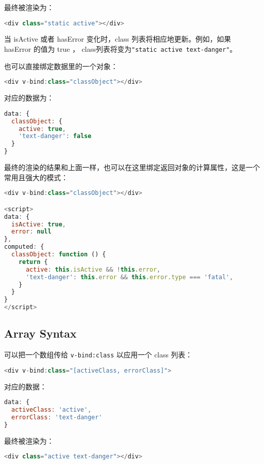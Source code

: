 最终被渲染为：


\begin{lstlisting}[language=JavaScript]
<div class="static active"></div>
\end{lstlisting}

当 isActive 或者 hasError 变化时，class 列表将相应地更新。例如，如果 hasError 的值为 true ， class列表将变为\texttt{"static active text-danger"}。

也可以直接绑定数据里的一个对象：

\begin{lstlisting}[language=JavaScript]
<div v-bind:class="classObject"></div>
\end{lstlisting}

对应的数据为：

\begin{lstlisting}[language=JavaScript]
data: {
  classObject: {
    active: true,
    'text-danger': false
  }
}
\end{lstlisting}

最终的渲染的结果和上面一样，也可以在这里绑定返回对象的计算属性，这是一个常用且强大的模式：

\begin{lstlisting}[language=JavaScript]
<div v-bind:class="classObject"></div>

<script>
data: {
  isActive: true,
  error: null
},
computed: {
  classObject: function () {
    return {
      active: this.isActive && !this.error,
      'text-danger': this.error && this.error.type === 'fatal',
    }
  }
}
</script>
\end{lstlisting}


\subsection{Array Syntax}

可以把一个数组传给 \texttt{v-bind:class} 以应用一个 class 列表：


\begin{lstlisting}[language=JavaScript]
<div v-bind:class="[activeClass, errorClass]">
\end{lstlisting}

对应的数据：

\begin{lstlisting}[language=JavaScript]
data: {
  activeClass: 'active',
  errorClass: 'text-danger'
}
\end{lstlisting}

最终被渲染为：

\begin{lstlisting}[language=JavaScript]
<div class="active text-danger"></div>
\end{lstlisting}

